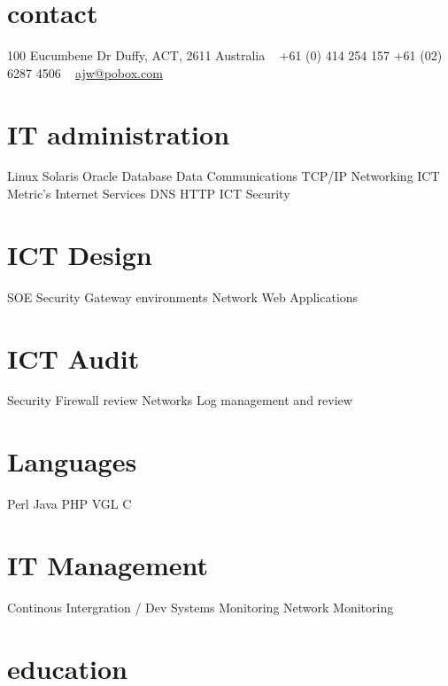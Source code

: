 \documentclass[]{friggeri-cv} %
\begin{document}


\begin{aside} %
\section{contact}
100 Eucumbene Dr
Duffy, ACT, 2611
Australia
~
+61 (0) 414 254 157
+61 (02) 6287 4506
~
\href{mailto:ajw@pobox.com}{ajw@pobox.com}
\section{IT administration}
Linux
Solaris
Oracle Database
Data Communications
TCP/IP Networking
ICT Metric’s
Internet Services
DNS
HTTP
ICT Security
\section{ICT Design}
SOE
Security
Gateway environments
Network
Web Applications
\section{ICT Audit}
Security
Firewall review
Networks
Log management and review
\section{Languages}
Perl
Java
PHP
VGL
C
\section{IT Management}
Continous Intergration / Dev
Systems Monitoring
Network Monitoring
\end{aside}



\section{education}
\end{document}
